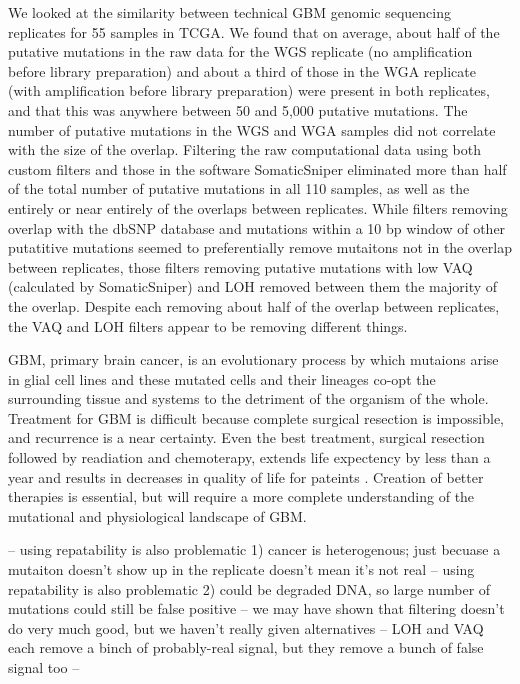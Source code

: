 \documentclass[11pt]{article} %
\begin{document}
We looked at the similarity between technical GBM genomic sequencing replicates for 55 samples in TCGA. We found that on average, about half of the putative mutations in the raw data for the WGS replicate (no amplification before library preparation) and about a third of those in the WGA replicate (with amplification before library preparation) were present in both replicates, and that this was anywhere between 50 and 5,000 putative mutations. The number of putative mutations in the WGS and WGA samples did not correlate with the size of the overlap. Filtering the raw computational data using both custom filters and those in the software SomaticSniper eliminated more than half of the total number of putative mutations in all 110 samples, as well as the entirely or near entirely of the overlaps between replicates. While filters removing overlap with the dbSNP database and mutations within a 10 bp window of other putatitive mutations seemed to preferentially remove mutaitons not in the overlap between replicates, those filters removing putative mutations with low VAQ (calculated by SomaticSniper) and LOH removed between them the majority of the overlap. Despite each removing about half of the overlap between replicates, the VAQ and LOH filters appear to be removing different things.

GBM, primary brain cancer, is an evolutionary process by which mutaions arise in glial cell lines and these mutated cells and their lineages co-opt the surrounding tissue and systems to the detriment of the organism of the whole. Treatment for GBM is difficult because complete surgical resection is impossible, and recurrence is a near certainty. Even the best treatment, surgical resection followed by readiation and chemoterapy, extends life expectency by less than a year and results in decreases in quality of life for pateints \cite{GBM-treatments}. Creation of better therapies is essential, but will require a more complete understanding of the mutational and physiological landscape of GBM. 

-- using repatability is also problematic 1) cancer is heterogenous; just becuase a mutaiton doesn't show up in the replicate doesn't mean it's not real
-- using repatability is also problematic 2) could be degraded DNA, so large number of mutations could still be false positive
-- we may have shown that filtering doesn't do very much good, but we haven't really given alternatives
-- LOH and VAQ each remove a binch of probably-real signal, but they remove a bunch of false signal too
-- 
\end{document}
